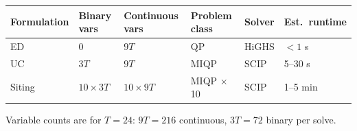 \documentclass[11pt, letterpaper]{article}
\begin{document}
\begin{tabular}{@{}llllll@{}}
  \toprule
  Formulation & Binary vars & Continuous vars & Problem class & Solver & Est.\ runtime \\
  \midrule
  ED      & 0        & $9T$       & QP   & HiGHS & $<1$ s \\
  UC      & $3T$     & $9T$       & MIQP & SCIP  & 5--30 s \\
  Siting  & $10\times3T$ & $10\times9T$ & MIQP $\times$ 10 & SCIP & 1--5 min \\
  \bottomrule
\end{tabular}

\vspace{0.5em}
Variable counts are for $T=24$: $9T = 216$ continuous, $3T = 72$ binary per solve.
\end{document}

